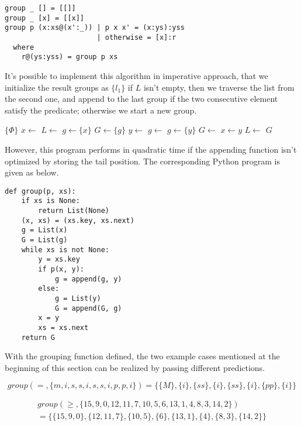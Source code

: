 \documentclass{article}
\begin{document}
\lstset{language=Haskell}
\begin{lstlisting}
group _ [] = [[]]
group _ [x] = [[x]]
group p (x:xs@(x':_)) | p x x' = (x:ys):yss
                      | otherwise = [x]:r
  where
    r@(ys:yss) = group p xs
\end{lstlisting}

It's possible to implement this algorithm in imperative approach, that we initialize the result groups as
$\{{l_1\}}$ if $L$ isn't empty, then we traverse the list from the second one, and append to the last group
if the two consecutive element satisfy the predicate; otherwise we start a new group.

\begin{algorithmic}
    \State \Return $\{ \Phi \}$
  \EndIf
  \State $x \gets$ 
  \State $L \gets$ 
  \State $g \gets \{ x \}$
  \State $G \gets \{ g \}$
    \State $y \gets$ 
      \State $g \gets $ 
    \Else
      \State $g \gets \{y\}$
      \State $G \gets$ 
    \EndIf
    \State $x \gets y$
    \State $L \gets$ 
  \EndWhile
  \State \Return $G$
\EndFunction
\end{algorithmic}

However, this program performs in quadratic time if the appending function isn't optimized by storing the tail position.
The corresponding Python program is given as below.

\lstset{language=Python}
\begin{lstlisting}
def group(p, xs):
    if xs is None:
        return List(None)
    (x, xs) = (xs.key, xs.next)
    g = List(x)
    G = List(g)
    while xs is not None:
        y = xs.key
        if p(x, y):
            g = append(g, y)
        else:
            g = List(y)
            G = append(G, g)
        x = y
        xs = xs.next
    return G
\end{lstlisting}

With the grouping function defined, the two example cases mentioned at the beginning of this section can be
realized by passing different predictions. 

\[
group(=, \{m,i,s,s,i,s,s,i,p,p,i\}) = \{ \{M\}, \{i\}, \{ss\}, \{i\}, \{ss\}, \{i\}, \{pp\}, \{i\} \}
\]

\[
\begin{array}{l}
group(\geq,  \{15, 9, 0, 12, 11, 7, 10, 5, 6, 13, 1, 4, 8, 3, 14, 2\}) \\
  = \{ \{15, 9, 0\}, \{12, 11, 7\}, \{10, 5\}, \{6\}, \{13, 1\}, \{4\}, \{8, 3\}, \{14, 2\}\}
\end{array}
\]
\end{document}
